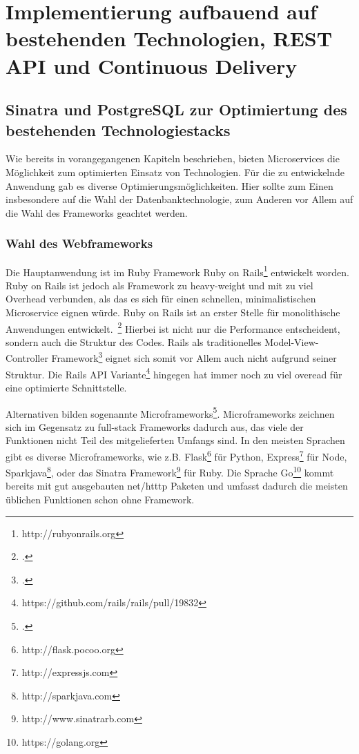 \chapter{Implementierung aufbauend auf bestehenden Technologien, REST API und Continuous Delivery}

\section{Sinatra und PostgreSQL zur Optimiertung des bestehenden Technologiestacks}
Wie bereits in vorangegangenen Kapiteln beschrieben, bieten Microservices die Möglichkeit zum optimierten Einsatz von Technologien. Für die zu entwickelnde Anwendung gab es diverse Optimierungsmöglichkeiten. Hier sollte zum Einen insbesondere auf die Wahl der Datenbanktechnologie, zum Anderen vor Allem auf die Wahl des Frameworks geachtet werden.

\subsection{Wahl des Webframeworks}
Die Hauptanwendung ist im Ruby Framework Ruby on Rails\footnote{http://rubyonrails.org} entwickelt worden. Ruby on Rails ist jedoch als Framework zu heavy-weight und mit zu viel Overhead verbunden, als das es sich für einen schnellen, minimalistischen Microservice eignen würde. Ruby on Rails ist an erster Stelle für monolithische Anwendungen entwickelt.~\footcite[][]{rails:doctrine}
Hierbei ist nicht nur die Performance entscheident, sondern auch die Struktur des Codes. Rails als traditionelles Model-View-Controller Framework\footcite[][]{wiki:mvc} eignet sich somit vor Allem auch nicht aufgrund seiner Struktur. Die Rails API Variante\footnote{https://github.com/rails/rails/pull/19832} hingegen hat immer noch zu viel overead für eine optimierte Schnittstelle.

Alternativen bilden sogenannte Microframeworks\footcite[][]{wiki:micro}. Microframeworks zeichnen sich im Gegensatz zu full-stack Frameworks dadurch aus, das viele der Funktionen nicht Teil des mitgelieferten Umfangs sind. In den meisten Sprachen gibt es diverse Microframeworks, wie z.B. Flask\footnote{http://flask.pocoo.org} für Python, Express\footnote{http://expressjs.com} für Node, Sparkjava\footnote{http://sparkjava.com}, oder das Sinatra Framework\footnote{http://www.sinatrarb.com} für Ruby. Die Sprache Go\footnote{https://golang.org} kommt bereits mit gut ausgebauten net/htttp Paketen und umfasst dadurch die meisten üblichen Funktionen schon ohne Framework.

